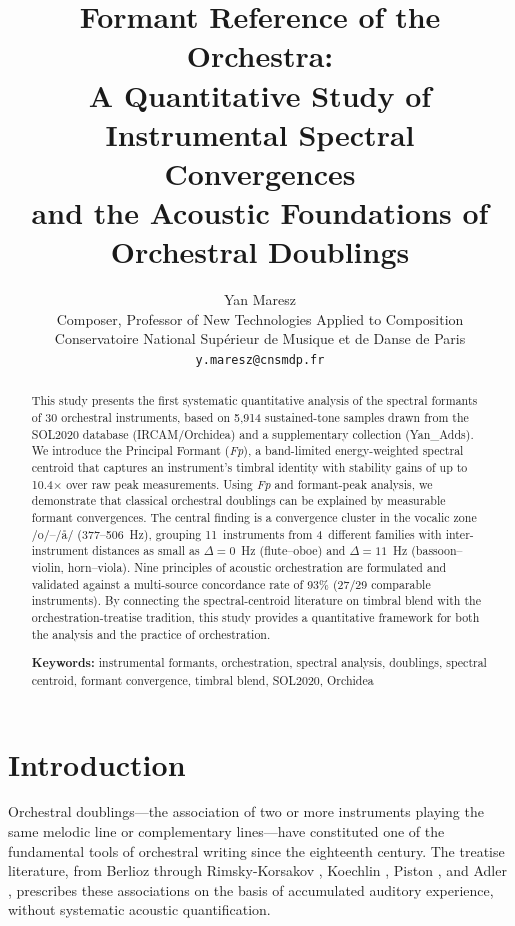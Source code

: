 \documentclass[12pt,a4paper]{article}
\title{Formant Reference of the Orchestra:\\
A Quantitative Study of Instrumental Spectral Convergences\\
and the Acoustic Foundations of Orchestral Doublings}
\author{Yan Maresz\\[6pt]
\small Composer, Professor of New Technologies Applied to Composition\\
\small Conservatoire National Sup\'erieur de Musique et de Danse de Paris\\
\small \texttt{y.maresz@cnsmdp.fr}
}
\date{}
\begin{document}
\maketitle

\begin{abstract}
This study presents the first systematic quantitative analysis of the spectral
formants of 30 orchestral instruments, based on 5,914 sustained-tone samples
drawn from the SOL2020 database (IRCAM/Orchidea) and a supplementary
collection (Yan\_Adds). We introduce the Principal Formant (\textit{Fp}), a
band-limited energy-weighted spectral centroid that captures an instrument's
timbral identity with stability gains of up to 10.4$\times$ over raw peak
measurements. Using \textit{Fp} and formant-peak analysis, we demonstrate that
classical orchestral doublings can be explained by measurable formant
convergences. The central finding is a convergence cluster in the vocalic zone
/o/--/\aa/ (377--506~Hz), grouping 11~instruments from 4~different families
with inter-instrument distances as small as $\Delta = 0$~Hz (flute--oboe) and
$\Delta = 11$~Hz (bassoon--violin, horn--viola). Nine principles of acoustic
orchestration are formulated and validated against a multi-source concordance
rate of 93\% (27/29 comparable instruments). By connecting the spectral-centroid
literature on timbral blend \citep{Sandell1995,Tardieu2012,Goodchild2018} with
the orchestration-treatise tradition, this study provides a quantitative
framework for both the analysis and the practice of orchestration.

\medskip
\noindent\textbf{Keywords:} instrumental formants, orchestration, spectral analysis,
doublings, spectral centroid, formant convergence, timbral blend, SOL2020, Orchidea
\end{abstract}

\section{Introduction}

Orchestral doublings---the association of two or more instruments playing the
same melodic line or complementary lines---have constituted one of the
fundamental tools of orchestral writing since the eighteenth century. The
treatise literature, from Berlioz \citep{Berlioz1844} through Rimsky-Korsakov
\citep{RimskyKorsakov1908}, Koechlin \citep{Koechlin1943}, Piston
\citep{Piston1955}, and Adler \citep{Adler1982}, prescribes these associations
on the basis of accumulated auditory experience, without systematic acoustic
quantification.
\end{document}
